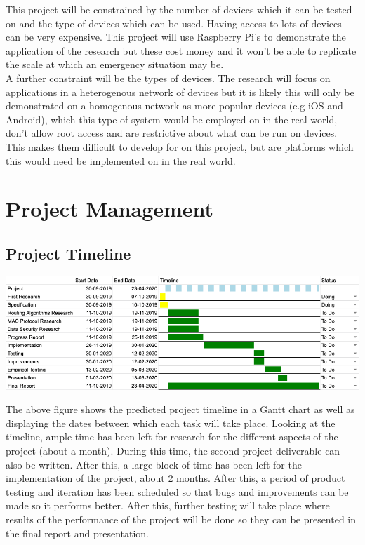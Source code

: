 \documentclass{report}
\begin{document}
This project will be constrained by the number of devices which it can be tested on and the type of devices which can be used. Having access 
to lots of devices can be very expensive. This project will use Raspberry Pi's to demonstrate the application of the research but these cost 
money and it won't be able to replicate the scale at which an emergency situation may be.
\bigskip\\
A further constraint will be the types of devices. The research will focus on applications in a heterogenous network of devices but it is 
likely this will only be demonstrated on a homogenous network as more popular devices (e.g iOS and Android\cite{mobileOS}), which this type of system would be employed on in the 
real world, don't allow root access and are restrictive about what can be run on devices. This makes them difficult to develop for on this project, but are platforms which 
this would need be implemented on in the real world.

\chapter*{Project Management}

\section*{Project Timeline}

\includegraphics[scale=0.35]{ProjectTimeline}

\bigskip

The above figure shows the predicted project timeline in a Gantt chart as well as displaying the dates between 
which each task will take place. Looking at the timeline, ample time has been left for research for the different aspects of the 
project (about a month). During this time, the second project deliverable can also be written. After this, a large block of time 
has been left for the implementation of the project, about 2 months. After this, a period of product testing and iteration has been 
scheduled so that bugs and improvements can be made so it performs better. After this, further testing will take place where results 
of the performance of the project will be done so they can be presented in the final report and presentation. 
\end{document}
